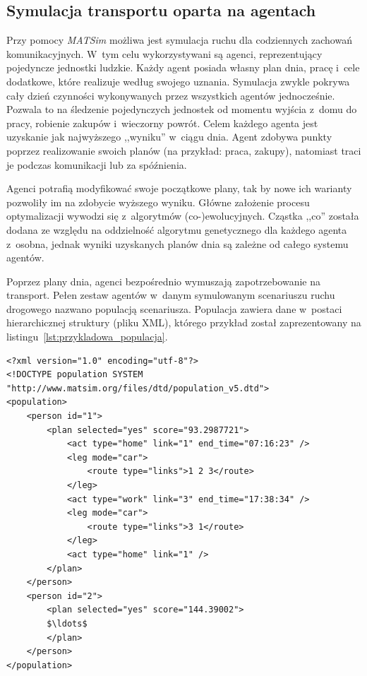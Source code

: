 \documentclass[twoside,12pt]{report}
\begin{document}
\subsection{Symulacja transportu oparta na agentach}\label{rozdz.agenci}
Przy pomocy \textit{MATSim} możliwa jest symulacja ruchu dla codziennych zachowań komunikacyjnych. W~tym celu wykorzystywani są agenci, reprezentujący pojedyncze jednostki ludzkie. Każdy agent posiada własny plan dnia, pracę i~cele dodatkowe, które realizuje według swojego uznania. Symulacja zwykle pokrywa cały dzień czynności wykonywanych przez wszystkich agentów jednocześnie. Pozwala to na śledzenie pojedynczych jednostek od momentu wyjścia z~domu do pracy, robienie zakupów i~wieczorny powrót. Celem każdego agenta jest uzyskanie jak najwyższego ,,wyniku'' w~ciągu dnia. Agent zdobywa punkty poprzez realizowanie swoich planów (na przykład: praca, zakupy), natomiast traci je podczas komunikacji lub za spóźnienia.

Agenci potrafią modyfikować swoje początkowe plany, tak by nowe ich warianty pozwoliły im na zdobycie wyższego wyniku. Główne założenie procesu optymalizacji wywodzi się z~algorytmów (co-)ewolucyjnych. Cząstka ,,co'' została dodana ze względu na oddzielność algorytmu genetycznego dla każdego agenta z~osobna, jednak wyniki uzyskanych planów dnia są zależne od całego systemu agentów. 

Poprzez plany dnia, agenci bezpośrednio wymuszają zapotrzebowanie na transport. Pełen zestaw agentów w~danym symulowanym scenariuszu ruchu drogowego nazwano populacją scenariusza. Populacja zawiera dane w~postaci hierarchicznej struktury (pliku XML), którego przykład został zaprezentowany na listingu~\ref{lst:przykladowa_populacja}.

\begin{lstlisting}[caption=Przykładowy plik populacji scenariusza zawierający plany dnia agentów, label=lst:przykladowa_populacja, mathescape]
<?xml version="1.0" encoding="utf-8"?>
<!DOCTYPE population SYSTEM "http://www.matsim.org/files/dtd/population_v5.dtd">
<population>
	<person id="1">
		<plan selected="yes" score="93.2987721">
			<act type="home" link="1" end_time="07:16:23" />
			<leg mode="car">
				<route type="links">1 2 3</route>
			</leg>
			<act type="work" link="3" end_time="17:38:34" />
			<leg mode="car">
				<route type="links">3 1</route>
			</leg>
			<act type="home" link="1" />
		</plan>
	</person>
	<person id="2">
		<plan selected="yes" score="144.39002">
		$\ldots$
		</plan>
	</person>
</population>
\end{lstlisting}
\end{document}
